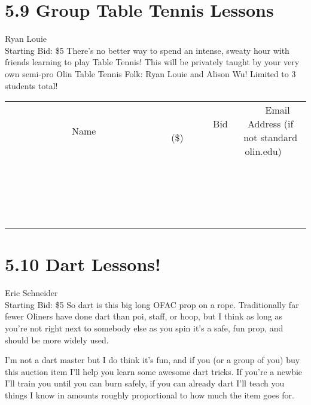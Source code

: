 \documentclass[11pt]{article}
\begin{document}
\section*{5.9 Group Table Tennis Lessons}
Ryan Louie
\\
Starting Bid: \$5
\newline
There's no better way to spend an intense, sweaty hour with friends learning to play Table Tennis!   This will be privately taught by your very own semi-pro Olin Table Tennis Folk: Ryan Louie and Alison Wu!
Limited to 3 students total!
\\[3ex]
\begin{tabular}{c c c}
~~~~~~~~~~~~~Name~~~~~~~~~~~~~ & ~~~~~~~~~Bid (\$)~~~~~~~~~  & ~~~Email Address (if not standard olin.edu)~~~\\
 & & \\
\hline
 & & \\
\hline
 & & \\
\hline
 & & \\
\hline
 & & \\
\hline
 & & \\
\hline
 & & \\
\hline
 & & \\
\hline
 & & \\
\hline
 & & \\
\hline
 & & \\
\hline
 & & \\
\hline
 & & \\
\hline
 & & \\
\hline
 & & \\
\hline
 & & \\
\hline
 & & \\
\hline
 & & \\
\hline
 & & \\
\hline
\end{tabular}
\newpage
\section*{5.10 Dart Lessons!}
Eric Schneider
\\
Starting Bid: \$5
\newline
So dart is this big long OFAC prop on a rope. Traditionally far fewer Oliners have done dart than poi, staff, or hoop, but I think as long as you're not right next to somebody else as you spin it's a safe, fun prop, and should be more widely used.

I'm not a dart master but I do think it's fun, and if you (or a group of you) buy this auction item I'll help you learn some awesome dart tricks. If you're a newbie I'll train you until you can burn safely, if you can already dart I'll teach you things I know in amounts roughly proportional to how much the item goes for.
\end{document}
